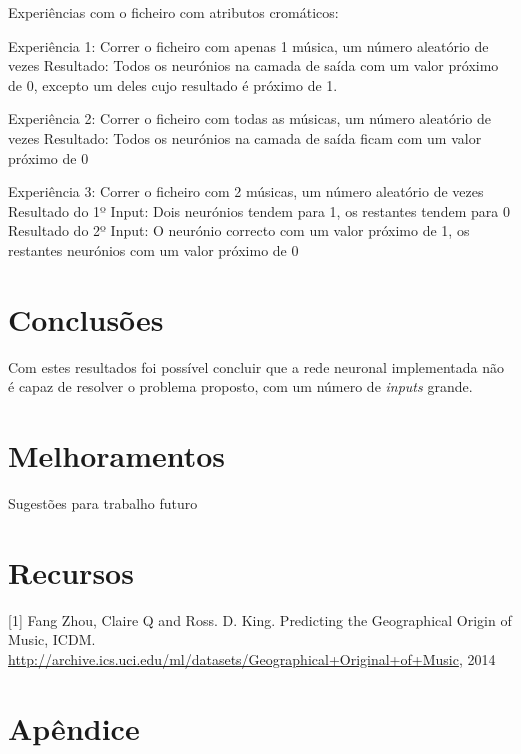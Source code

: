 \documentclass[a4paper]{article}
\begin{document}
Experiências com o ficheiro com atributos cromáticos:

Experiência 1: Correr o ficheiro com apenas 1 música, um número aleatório de vezes
Resultado: Todos os neurónios na camada de saída com um valor próximo de 0, excepto um deles cujo resultado é próximo de 1.

Experiência 2: Correr o ficheiro com todas as músicas, um número aleatório de vezes
Resultado: Todos os neurónios na camada de saída ficam com um valor próximo de 0

Experiência 3: Correr o ficheiro com 2 músicas, um número aleatório de vezes
Resultado do 1º Input: Dois neurónios tendem para 1, os restantes tendem para 0 
Resultado do 2º Input: O neurónio correcto com um valor próximo de 1, os restantes neurónios com um valor próximo de 0


\section{Conclusões}
Com estes resultados foi possível concluir que a rede neuronal implementada não é capaz de resolver o problema proposto, com um número de \textit{inputs} grande. 


\section{Melhoramentos}

Sugestões para trabalho futuro


\section{Recursos}

[1] Fang Zhou, Claire Q and Ross. D. King. Predicting the Geographical Origin of Music, ICDM.
\url{http://archive.ics.uci.edu/ml/datasets/Geographical+Original+of+Music}, 2014

\clearpage


\section{Apêndice}
\end{document}
